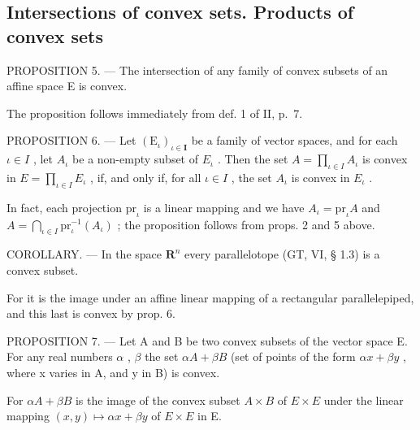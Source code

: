 \subsection{Intersections of convex sets. Products of convex sets}

PROPOSITION 5. --- The intersection of any family of convex subsets of an affine space E is convex.

The proposition follows immediately from def. 1 of II, p.~7.

PROPOSITION 6. --- Let \((\mathrm{E}_{\iota})_{\iota\in\mathbf{I}}\) be a family of vector spaces, and for each \(\iota\in I\) , let \(A_{\iota}\) be a non-empty subset of \(E_{\iota}\) . Then the set \(A=\prod_{\iota\in I}A_{\iota}\) is convex in \(E=\prod_{\iota\in I}E_{\iota}\) , if, and only if, for all \(\iota\in I\) , the set \(A_{\iota}\) is convex in \(E_{\iota}\) .

In fact, each projection \(\mathrm{pr}_{\iota}\) is a linear mapping and we have \(A_{\iota} = \mathrm{pr}_{\iota}A\) and \(A = \bigcap_{\iota \in I} \mathrm{pr}_{\iota}^{-1}(A_{\iota})\) ; the proposition follows from props. 2 and 5 above.

COROLLARY. --- In the space \(\mathbf{R}^n\) every parallelotope (GT, VI, § 1.3) is a convex subset.

For it is the image under an affine linear mapping of a rectangular parallelepiped, and this last is convex by prop. 6.

PROPOSITION 7. --- Let A and B be two convex subsets of the vector space E. For any real numbers \(\alpha\) , \(\beta\) the set \(\alpha A + \beta B\) (set of points of the form \(\alpha x + \beta y\) , where x varies in A, and y in B) is convex.

For \(\alpha A + \beta B\) is the image of the convex subset \(A \times B\) of \(E \times E\) under the linear mapping \((x, y) \mapsto \alpha x + \beta y\) of \(E \times E\) in E.

